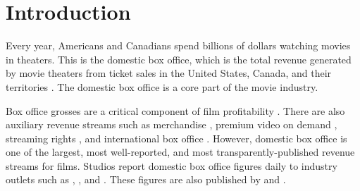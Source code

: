 \documentclass[12pt]{article}
\begin{document}
\section{Introduction} \label{sec:intro}

Every year, Americans and Canadians spend billions of dollars watching movies in theaters. This is the domestic box office, which is the total revenue generated by movie theaters from ticket sales in the United States, Canada, and their territories \citep{numbersGlossary}. The domestic box office is a core part of the movie industry.

Box office grosses are a critical component of film profitability \citep{varietyOpeningWeekend}. There are also auxiliary revenue streams such as merchandise \citep{dunePopcorn}, premium video on demand \citep{wickedPvod}, streaming rights \citep{sonyNetflix}, and international box office \citep{dceuProfit}. However, domestic box office is one of the largest, most well-reported, and most transparently-published revenue streams for films. Studios report domestic box office figures daily to industry outlets such as \cite{deadlineHome}, \cite{hollywoodReporterHome}, and \cite{varietyHome}. These figures are also published by \cite{numbersHome} and \cite{bomHome}.
\end{document}
